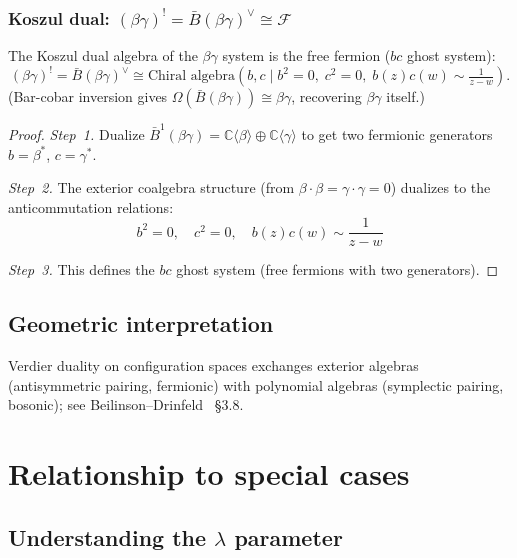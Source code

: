 \subsubsection{\texorpdfstring{Koszul dual: $(\beta\gamma)^! = \bar{B}(\beta\gamma)^\vee \cong \mathcal{F}$}{Koszul dual: (bg)! = F}}

\begin{theorem}
\label{thm:cobar-fermions}
The Koszul dual algebra of the $\beta\gamma$ system is the free fermion ($bc$ ghost system):
\[(\beta\gamma)^! = \bar{B}(\beta\gamma)^\vee \cong \text{Chiral algebra}(b, c \mid b^2 = 0,\; c^2 = 0,\; b(z)c(w) \sim \tfrac{1}{z-w}).\]
(Bar-cobar inversion gives $\Omega(\bar{B}(\beta\gamma)) \cong \beta\gamma$, recovering $\beta\gamma$ itself.)
\end{theorem}

\begin{proof}
\emph{Step~1.} Dualize $\bar{B}^1(\beta\gamma) = \mathbb{C}\langle \beta \rangle \oplus \mathbb{C}\langle \gamma \rangle$
to get two fermionic generators $b = \beta^*$, $c = \gamma^*$.

\emph{Step~2.} The exterior coalgebra structure (from $\beta \cdot \beta = \gamma \cdot \gamma = 0$) dualizes to the anticommutation relations:
\[b^2 = 0, \quad c^2 = 0, \quad b(z)c(w) \sim \frac{1}{z-w}\]

\emph{Step~3.} This defines the $bc$ ghost system (free fermions with two generators).
\end{proof}

\subsection{Geometric interpretation}
\label{subsec:NAP-betagamma}

\begin{remark}
Verdier duality on configuration spaces exchanges exterior algebras (antisymmetric pairing, fermionic) with polynomial algebras (symplectic pairing, bosonic); see Beilinson--Drinfeld~\cite{BD04} \S3.8.
\end{remark}

\section{Relationship to special cases}

\subsection{\texorpdfstring{Understanding the $\lambda$ parameter}{Understanding the parameter}}

